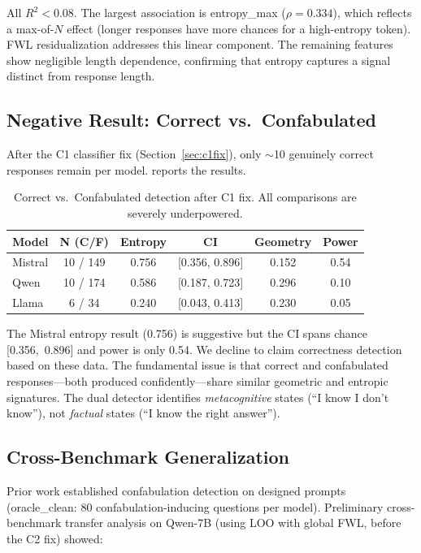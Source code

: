 \documentclass[11pt,a4paper]{article}
\begin{document}
All $R^2 < 0.08$. The largest association is entropy\_max ($\rho = 0.334$), which reflects a max-of-$N$ effect (longer responses have more chances for a high-entropy token). FWL residualization addresses this linear component. The remaining features show negligible length dependence, confirming that entropy captures a signal distinct from response length.

\subsection{Negative Result: Correct vs.\ Confabulated}

After the C1 classifier fix (Section~\ref{sec:c1fix}), only $\sim$10 genuinely correct responses remain per model.  reports the results.

\begin{table}[H]
\centering
\caption{Correct vs.\ Confabulated detection after C1 fix. All comparisons are severely underpowered.}
\label{tab:cc}
\begin{tabular}{lccccc}
\toprule
\textbf{Model} & \textbf{N (C/F)} & \textbf{Entropy} & \textbf{CI} & \textbf{Geometry} & \textbf{Power} \\
\midrule
Mistral & 10 / 149 & 0.756 & [0.356, 0.896] & 0.152 & 0.54 \\
Qwen & 10 / 174 & 0.586 & [0.187, 0.723] & 0.296 & 0.10 \\
Llama & 6 / 34 & 0.240 & [0.043, 0.413] & 0.230 & 0.05 \\
\bottomrule
\end{tabular}
\end{table}

The Mistral entropy result (0.756) is suggestive but the CI spans chance [0.356,~0.896] and power is only 0.54. We decline to claim correctness detection based on these data. The fundamental issue is that correct and confabulated responses---both produced confidently---share similar geometric and entropic signatures. The dual detector identifies \emph{metacognitive} states (``I know I don't know''), not \emph{factual} states (``I know the right answer'').

\subsection{Cross-Benchmark Generalization}

Prior work \citep{edrington2026detecting} established confabulation detection on designed prompts (oracle\_clean: 80 confabulation-inducing questions per model). Preliminary cross-benchmark transfer analysis on Qwen-7B (using LOO with global FWL, before the C2 fix) showed:
\end{document}
